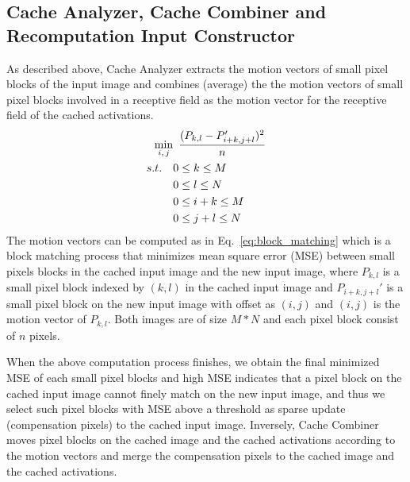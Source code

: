 
\subsection{Cache Analyzer, Cache Combiner and Recomputation Input Constructor}
As described above, Cache Analyzer extracts the motion vectors of small pixel blocks of the input image and combines (average) the the motion vectors of small pixel blocks involved in a receptive field as the motion vector for the receptive field of the cached activations.
\begin{equation}
    \begin{aligned}
        \min\limits_{\textit{\textbf{$i,j$}}} &\enspace \frac{(P_{k,l}-P_{i+k,j+l}')^2}{n}\\
         s.t. \enspace \enspace& 0 \le k \le M \\
         & 0 \le l \le N \\
         & 0 \le i + k \le M \\
         & 0 \le j + l \le N \\
    \end{aligned}
    \label{eq:block_matching}
\end{equation}
The motion vectors can be computed as in Eq.~\ref{eq:block_matching} which is a block matching process that minimizes mean square error (MSE) between small pixels blocks in the cached input image and the new input image, where $P_{k,l}$ is a small pixel block indexed by $(k,l)$ in the cached input image and $P_{i+k,j+l}'$ is a small pixel block on the new input image with offset as $(i,j)$ and $(i,j)$ is the motion vector of $P_{k,l}$. 
Both images are of size $M*N$ and each pixel block consist of $n$ pixels.

When the above computation process finishes, we obtain the final minimized MSE of each small pixel blocks and high MSE indicates that a pixel block on the cached input image cannot finely match on the new input image, and thus we select such pixel blocks with MSE above a threshold as sparse update (compensation pixels) to the cached input image.
Inversely, Cache Combiner moves pixel blocks on the cached image and the cached activations according to the motion vectors and merge the compensation pixels to the cached image and the cached activations.

